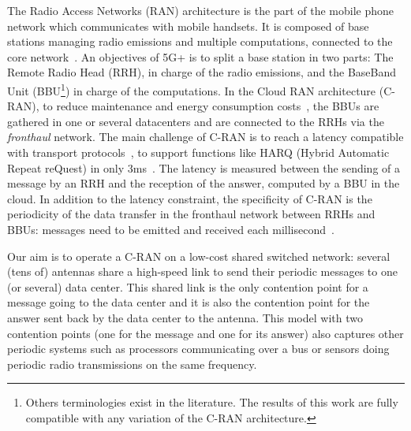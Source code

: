 \documentclass[a4paper,UKenglish,cleveref, autoref, thm-restate]{lipics-v2019}
\begin{document}
The Radio Access Networks (RAN) architecture is the part of the mobile phone network which communicates with mobile handsets. It is composed of base stations managing radio emissions and multiple computations, connected to the core network~\cite{bouguen2012lte}.
An objectives of 5G+ is to split a base station in two parts: The Remote Radio Head (RRH), in charge of the radio emissions, and the BaseBand Unit (BBU\footnote{Others terminologies exist in the literature. The results of this work are fully compatible with any variation of the C-RAN architecture.}) in charge of the computations. In the Cloud RAN architecture
(C-RAN), to reduce maintenance and energy consumption costs~\cite{gavrilovska2020cloud,mobile2011c,checko2014cloud}, the BBUs are gathered in one or several datacenters and are connected to the RRHs via the \emph{fronthaul} network.
 The main challenge of C-RAN is to reach a latency compatible with transport protocols~\cite{ieeep802}, to support functions like  HARQ (Hybrid Automatic Repeat reQuest) in only $3$ms~\cite{bouguen2012lte}. The latency is measured between the sending of a message by an RRH and the reception of the answer, computed by a BBU in the cloud.
  In addition to the latency constraint, the specificity of C-RAN is the periodicity of the data transfer in the fronthaul network between RRHs and BBUs: messages need to be emitted and received each millisecond~\cite{3gpp5g,romano2019imt}.

Our aim is to operate a C-RAN on a low-cost shared switched network: several (tens of) antennas share a high-speed link to send their periodic messages to one (or several) data center. This shared link is the only contention point for a message going to the data center and it is also the contention point for the answer sent back by the data center to the antenna. This model with two contention points (one for the message and one for its answer) also captures other periodic systems such as processors communicating over a bus or sensors doing periodic radio transmissions on the same frequency.
\end{document}
